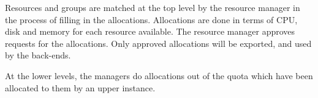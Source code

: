 Resources and groups are matched at the top level by the resource manager in the process of filling in the allocations. Allocations are done in terms of CPU, disk and memory for each resource available. 
The resource manager approves requests for the allocations. Only approved allocations will be exported, 
and used by the back-ends.

At the lower levels, the managers do allocations out of the quota which have been allocated to them by an upper instance. 



